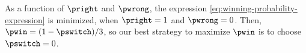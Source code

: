 As a function of $\pright$ and $\pwrong$, the expression \eqref{eq:winning-probability-expression} is minimized, when $\pright=1$ and $\pwrong=0$.
Then, $\pwin=(1-\pswitch)/3$, so our best strategy to maximize $\pwin$ is to choose $\pswitch=0$.
